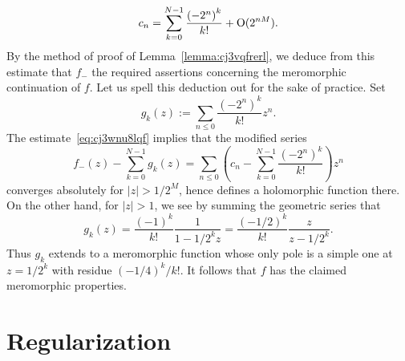 \documentclass[reqno]{amsart} 
\begin{document}
\begin{example}
\begin{equation}
    c_n = \sum_{k = 0}^{N-1} \frac{{(-2^n)}^k}{k!} + \operatorname{O} (2^{nM}).
  \end{equation}
  By the method of proof of Lemma~\ref{lemma:cj3vqfrerl}, we deduce from this estimate that $f_-$ the required assertions concerning the meromorphic continuation of $f$.  Let us spell this deduction out for the sake of practice.  Set
  \begin{equation*}
    g_k(z) := 
    \sum_{n \leq 0}
    \frac{{(-2^n)}^k}{k!} z^n.
  \end{equation*}
  The estimate~\eqref{eq:cj3wnu8lqf} implies that the modified series
  \begin{equation}\label{eq:cj3wnu7518}
    f_-(z)
    -
    \sum_{k = 0}^{N-1}
    g_k(z)
    = 
    \sum_{n \leq 0}
    \left( c_n -
      \sum_{k = 0}^{N-1} \frac{{(-2^n)}^k}{k!}
    \right) z^n
  \end{equation}
  converges absolutely for $\lvert z \rvert > 1 / 2^M$, hence defines a holomorphic function there.  On the other hand, for $\lvert z \rvert > 1$, we see by summing the geometric series that
  \begin{equation*}
    g_k(z)
    =
    \frac{{(-1)}^k}{k!}
    \frac{1}{1 - 1 / 2^k z}
    =
    \frac{{(-1/2)}^k}{k!}
    \frac{z}{z - 1 / 2^k}.
  \end{equation*}
  Thus $g_k$ extends to a meromorphic function whose only pole is a simple one at $z = 1/2^k$ with residue ${(-1/4)}^k / k!$.  It follows that $f$ has the claimed meromorphic properties.
\end{example}

\section{Regularization}\label{sec:cj4unj4gyo}
\end{document}
